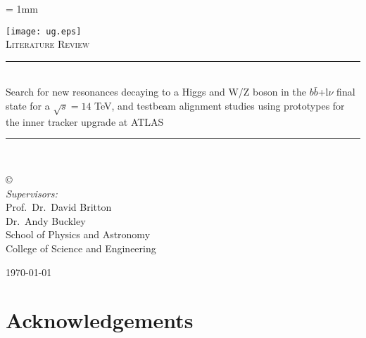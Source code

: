 \documentclass[12pt,a4paper]{report}
\newif\
\newcommand{\twolinesahead}[5][]{
  \def\dist{6};
  \newdimen\ym;
  \newdimen\xm;
  \newdimen\yf;
  \newdimen\xf;
  \ExtractCoordinate{$(#3)$}{\xm}{\ym};
  \ExtractCoordinate{$(#2)$}{\xf}{\yf};
  \ifdim \ym < \yf
  \def\fac{1};
  \else
  \def\fac{-1};
  \fi
  \path [pline] ([yshift=-\dist * \fac]#2.east) -- (#3.west);
  \coordinate (m) at ($(#2)!0.5!(#3)$);
  \coordinate (mp) at ($(m)+(0,1em*\fac)$);
  \node (nm) at (mp) {#5};
  \foreach \x in {\fac,0}
  {
    \ifnum \x = 0
    \path [pline, decoration={markings, mark=at position 0.5 with {\arrow{triangle 60}}}, postaction={decorate}] ([yshift=\dist * \x]#2.east) -- ([yshift=\dist * \x]#4.west);
    \else
    \path [pline] ([yshift=\dist * \x]#2.east) -- ([yshift=\dist * \x]#4.west);
    \fi
  };
}
\newcommand{\HRule}{\rule{\linewidth}{0.5mm}}
\begin{document}
\unitlength = 1mm

\onehalfspace

\begin{titlepage}
\begin{center}
\texttt{[image: ug.eps]}\\[1.0cm]


\textsc{\Large Literature Review}\\[0.8cm]

\HRule\\[0.6cm]
{ \Huge Search for new resonances decaying to a Higgs and W/Z boson in the $b\bar{b}$+l$\nu$ final state for a $\sqrt{s}=14$ TeV, and testbeam alignment studies using prototypes for the inner tracker upgrade at ATLAS }\\[0.6cm]
\HRule\\[0.7cm]

{
\Large

\copyright~\\[1.5cm]
\emph{Supervisors:} \\
Prof.~Dr.~David Britton\\
Dr.~Andy Buckley\\[0.5cm]

School of Physics and Astronomy\\
College of Science and Engineering\\[1.5cm]

}

\vfill

{\large \mydate\today}

\end{center}
\end{titlepage}



\begin{abstract}

\end{abstract}
\clearpage

\tableofcontents
\clearpage



\chapter*{Acknowledgements}

\clearpage
\end{document}
